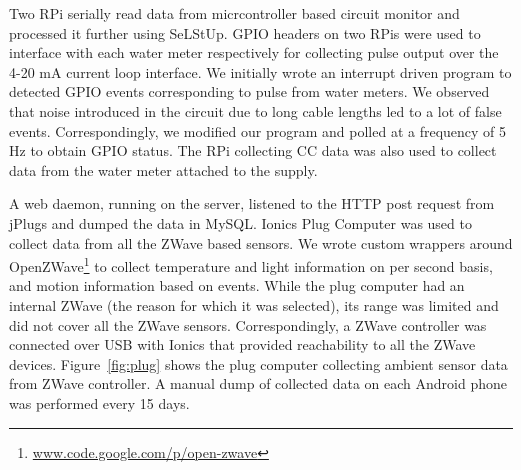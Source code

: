 \documentclass[10pt]{sensys-proc}
\newcommand{\figref}[1]{Figure~\ref{#1}}
\newcommand{\secref}[1]{Section~\ref{#1}}
\newcommand{\paradigm}{Sense-Local Store-Upload}
\newcommand{\selstup}{SeLStUp}
\begin{document}
Two RPi serially read data from micrcontroller based circuit monitor and processed it further using \selstup.
GPIO headers on two RPis were used to interface with each water meter respectively for collecting pulse output over the 4-20 mA current loop interface. We initially wrote an interrupt driven program to detected GPIO events corresponding to pulse from water meters. We observed that noise introduced in the circuit due to long cable lengths led to a lot of false events. Correspondingly, we modified our program and polled at a frequency of 5 Hz to obtain GPIO status. The RPi collecting CC data was also used to collect data from the water meter attached to the supply.%

A web daemon, running on the server, listened to the HTTP post request from jPlugs and dumped the data in MySQL. Ionics Plug Computer was used to collect data from all the ZWave based sensors. We wrote custom wrappers around OpenZWave\footnote{\url{www.code.google.com/p/open-zwave}} to collect temperature and light information on per second basis, and motion information based on events. While the plug computer had an internal ZWave (the reason for which it was selected), its range was limited and did not cover all the ZWave sensors. Correspondingly, a ZWave controller was connected over USB with Ionics that provided reachability to all the ZWave devices. %
\figref{fig:plug} shows the plug computer collecting ambient sensor data from ZWave controller. A manual dump of collected data on each Android phone was performed every 15 days.


\end{document}
